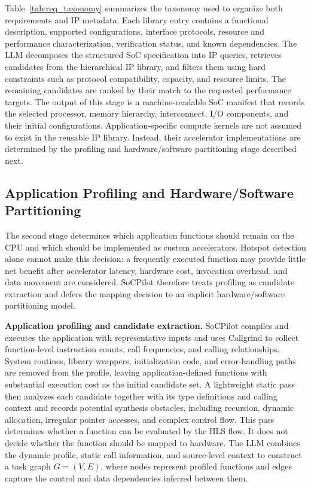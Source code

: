 Table~\ref{tab:req_taxonomy} summarizes the taxonomy used to organize both requirements and IP metadata. Each library entry contains a functional description, supported configurations, interface protocols, resource and performance characterization, verification status, and known dependencies. The LLM decomposes the structured SoC specification into IP queries, retrieves candidates from the hierarchical IP library, and filters them using hard constraints such as protocol compatibility, capacity, and resource limits. The remaining candidates are ranked by their match to the requested performance targets. The output of this stage is a machine-readable SoC manifest that records the selected processor, memory hierarchy, interconnect, I/O components, and their initial configurations. Application-specific compute kernels are not assumed to exist in the reusable IP library. Instead, their accelerator implementations are determined by the profiling and hardware/software partitioning stage described next.

\subsection{Application Profiling and Hardware/Software Partitioning}
The second stage determines which application functions should remain on the CPU and which should be implemented as custom accelerators. Hotspot detection alone cannot make this decision: a frequently executed function may provide little net benefit after accelerator latency, hardware cost, invocation overhead, and data movement are considered. SoCPilot therefore treats profiling as candidate extraction and defers the mapping decision to an explicit hardware/software partitioning model.

\textbf{Application profiling and candidate extraction.}
SoCPilot compiles and executes the application with representative inputs and uses Callgrind to collect function-level instruction counts, call frequencies, and calling relationships. System routines, library wrappers, initialization code, and error-handling paths are removed from the profile, leaving application-defined functions with substantial execution cost as the initial candidate set. A lightweight static pass then analyzes each candidate together with its type definitions and calling context and records potential synthesis obstacles, including recursion, dynamic allocation, irregular pointer accesses, and complex control flow. This pass determines whether a function can be evaluated by the HLS flow. It does not decide whether the function should be mapped to hardware. The LLM combines the dynamic profile, static call information, and source-level context to construct a task graph $G=(V,E)$, where nodes represent profiled functions and edges capture the control and data dependencies inferred between them.

